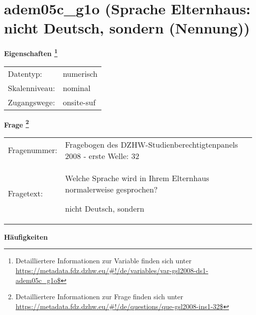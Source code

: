 
    \setcounter{footnote}{0}

    \vspace*{-1.8cm}
	\section{adem05c\_g1o (Sprache Elternhaus: nicht Deutsch, sondern (Nennung))}
	\label{section:adem05c_g1o}



    \vspace*{0.5cm}
    \noindent\textbf{Eigenschaften
	\footnote{Detailliertere Informationen zur Variable finden sich unter
		\url{https://metadata.fdz.dzhw.eu/\#!/de/variables/var-gsl2008-ds1-adem05c_g1o$}}}\\
	\begin{tabularx}{\hsize}{@{}lX}
	Datentyp: & numerisch \\
	Skalenniveau: & nominal \\
	Zugangswege: &
	  onsite-suf
 \\
    \end{tabularx}



				\vspace*{0.5cm}
                \noindent\textbf{Frage
	                \footnote{Detailliertere Informationen zur Frage finden sich unter
		              \url{https://metadata.fdz.dzhw.eu/\#!/de/questions/que-gsl2008-ins1-32$}}}\\
				\begin{tabularx}{\hsize}{@{}lX}
					Fragenummer: &
					  Fragebogen des DZHW-Studienberechtigtenpanels 2008 - erste Welle:
					  32
 \\
					Fragetext: & Welche Sprache wird in Ihrem Elternhaus normalerweise gesprochen?\par  nicht Deutsch, sondern \\
				\end{tabularx}





        		\vspace*{0.5cm}
                \noindent\textbf{Häufigkeiten}

